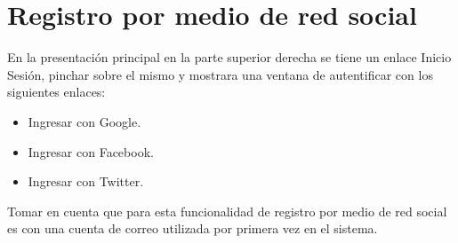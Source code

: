 \section{Registro por medio de red social}

En la presentación principal en la parte superior derecha se tiene un enlace 
Inicio Sesión, pinchar sobre el mismo y mostrara una ventana de autentificar
con los siguientes enlaces:

\begin{itemize}
	\item Ingresar con Google.
	\item Ingresar con Facebook.
	\item Ingresar con Twitter.
\end{itemize}

Tomar en cuenta que para esta funcionalidad de registro por medio de red social
es con una cuenta de correo utilizada por primera vez en el sistema.

